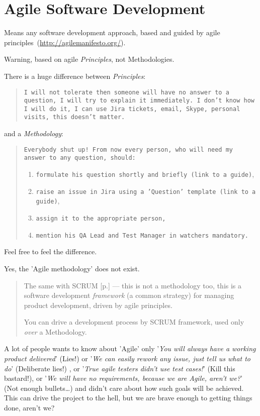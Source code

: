 \section{Agile Software Development}
\label{sec:Agile Software Development}

Means any software development approach, based and guided by agile principles~(\url{http://agilemanifesto.org/}).

Warning, based on agile \emph{Principles}, not Methodologies. 

There is a huge difference between \emph{Principles}:
\begin{quote}
\texttt{I will not tolerate then someone will have no answer to a question, I will try to explain it immediately. I don't know how I will do it, I can use Jira tickets, email, Skype, personal visits, this doesn't matter.}
\end{quote} 
and a \emph{Methodology}:
\begin{quote}
\texttt{Everybody shut up! From now every person, who will need my answer to any question, should:}
\begin{enumerate}
\item 
\texttt{formulate his question shortly and briefly (link to a guide)},

\item
\texttt{raise an issue in Jira using a 'Question' template (link to a guide)},

\item
\texttt{assign it to the appropriate person,}

\item 
\texttt{mention his QA Lead and Test Manager in watchers mandatory.}
\end{enumerate}
\end{quote} 

Feel free to feel the difference.

Yes, the 'Agile methodology' does not exist.

\begin{quote}
The same with SCRUM [p.\pageref{sec:SCRUM}] — this is not a methodology too, this is a software development \emph{framework} (a common strategy) for managing product development, driven by agile principles. 

You can drive a development process by SCRUM framework, used only \emph{over} a Methodology.
\end{quote} 

A lot of people wants to know about 'Agile' only '\textit{You will always have a working product delivered}' (Lies!) or '\textit{We can easily rework any issue, just tell us what to do}' (Deliberate lies!) , or '\textit{True agile testers didn't use test cases!}' (Kill this bastard!), or '\textit{We will have no requirements, because we are Agile, aren't we?}' (Not enough bullets\ldots) and didn't care about how such goals will be achieved. This can drive the project to the hell, but we are brave enough to getting things done, aren't we?